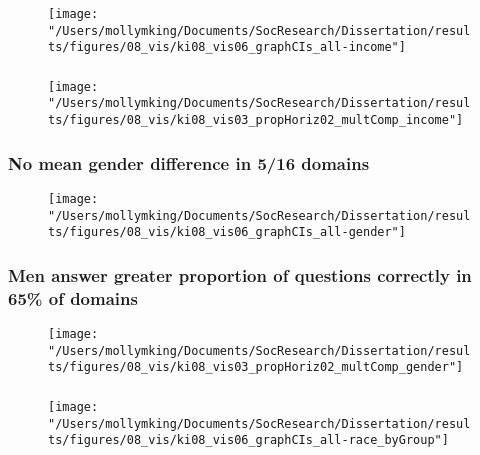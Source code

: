 \documentclass[pdf]{beamer}
\begin{document}
\begin{frame}
\frametitle{}
  \begin{figure}[ht]
    \begin{center}
    \texttt{[image: "/Users/mollymking/Documents/SocResearch/Dissertation/results/figures/08\_vis/ki08\_vis06\_graphCIs\_all-income"]}
    \end{center}
  \end{figure}
\end{frame}


\begin{frame}
\frametitle{}
  \begin{figure}[ht]
    \begin{center}
    \texttt{[image: "/Users/mollymking/Documents/SocResearch/Dissertation/results/figures/08\_vis/ki08\_vis03\_propHoriz02\_multComp\_income"]}
    \end{center}
  \end{figure}
\end{frame}


\begin{frame}
\frametitle{No mean gender difference in 5/16 domains}
  \begin{figure}[ht]
    \begin{center}
      \texttt{[image: "/Users/mollymking/Documents/SocResearch/Dissertation/results/figures/08\_vis/ki08\_vis06\_graphCIs\_all-gender"]}
    \end{center}
  \end{figure}
\end{frame}


\begin{frame}
\frametitle{Men answer greater proportion of questions correctly in 65\% of domains}
  \begin{figure}[ht]
    \begin{center}
      \texttt{[image: "/Users/mollymking/Documents/SocResearch/Dissertation/results/figures/08\_vis/ki08\_vis03\_propHoriz02\_multComp\_gender"]}
    \end{center}
  \end{figure}
\end{frame}


\begin{frame}
\frametitle{}
  \begin{figure}[ht]
    \begin{center}
    \texttt{[image: "/Users/mollymking/Documents/SocResearch/Dissertation/results/figures/08\_vis/ki08\_vis06\_graphCIs\_all-race\_byGroup"]}
    \end{center}
  \end{figure}
\end{frame}
\end{document}
